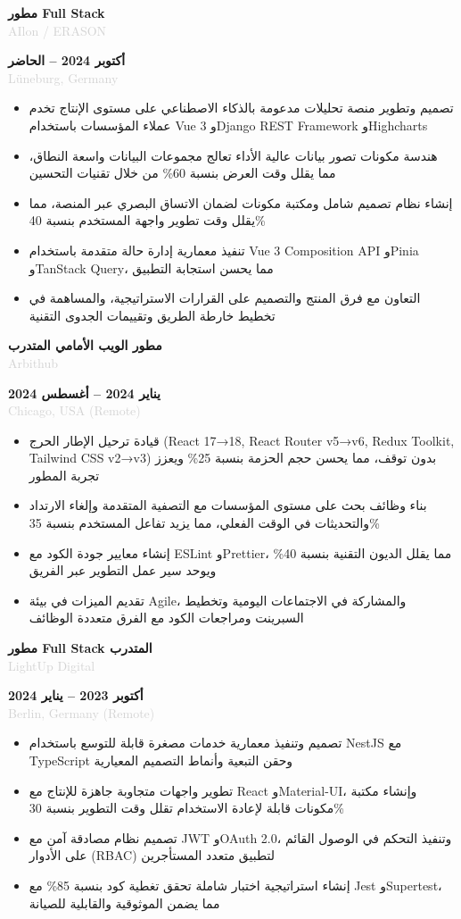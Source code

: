 \documentclass[10pt,a4paper]{article}
\newcommand{\Experience}[4]{%
  \vspace{2pt}
  \noindent
  \begin{minipage}[t]{0.70\textwidth}
    {\normalsize\textbf{\color{darkgray}#3}} \\
    \textcolor{lightgray}{\small #1}
  \end{minipage}%
  \hfill
  \begin{minipage}[t]{0.28\textwidth}
    \raggedleft
    \textcolor{mediumgray}{\small\textbf{#4}} \\
    \textcolor{lightgray}{\small #2}
  \end{minipage}
  \vspace{1pt}
}
\begin{document}
\Experience{AIlon / ERASON}{Lüneburg, Germany}{مطور Full Stack}{أكتوبر 2024 -- الحاضر}
\begin{itemize}
  \item تصميم وتطوير منصة تحليلات مدعومة بالذكاء الاصطناعي على مستوى الإنتاج تخدم عملاء المؤسسات باستخدام Vue 3 وDjango REST Framework وHighcharts
  \item هندسة مكونات تصور بيانات عالية الأداء تعالج مجموعات البيانات واسعة النطاق، مما يقلل وقت العرض بنسبة 60\% من خلال تقنيات التحسين
  \item إنشاء نظام تصميم شامل ومكتبة مكونات لضمان الاتساق البصري عبر المنصة، مما يقلل وقت تطوير واجهة المستخدم بنسبة 40\%
  \item تنفيذ معمارية إدارة حالة متقدمة باستخدام Vue 3 Composition API وPinia وTanStack Query، مما يحسن استجابة التطبيق
  \item التعاون مع فرق المنتج والتصميم على القرارات الاستراتيجية، والمساهمة في تخطيط خارطة الطريق وتقييمات الجدوى التقنية
\end{itemize}

\Experience{Arbithub}{Chicago, USA (Remote)}{مطور الويب الأمامي المتدرب}{يناير 2024 -- أغسطس 2024}
\begin{itemize}
  \item قيادة ترحيل الإطار الحرج (React 17→18, React Router v5→v6, Redux Toolkit, Tailwind CSS v2→v3) بدون توقف، مما يحسن حجم الحزمة بنسبة 25\% ويعزز تجربة المطور
  \item بناء وظائف بحث على مستوى المؤسسات مع التصفية المتقدمة وإلغاء الارتداد والتحديثات في الوقت الفعلي، مما يزيد تفاعل المستخدم بنسبة 35\%
  \item إنشاء معايير جودة الكود مع ESLint وPrettier، مما يقلل الديون التقنية بنسبة 40\% ويوحد سير عمل التطوير عبر الفريق
  \item تقديم الميزات في بيئة Agile، والمشاركة في الاجتماعات اليومية وتخطيط السبرينت ومراجعات الكود مع الفرق متعددة الوظائف
\end{itemize}

\Experience{LightUp Digital}{Berlin, Germany (Remote)}{مطور Full Stack المتدرب}{أكتوبر 2023 -- يناير 2024}
\begin{itemize}
  \item تصميم وتنفيذ معمارية خدمات مصغرة قابلة للتوسع باستخدام NestJS مع TypeScript وحقن التبعية وأنماط التصميم المعيارية
  \item تطوير واجهات متجاوبة جاهزة للإنتاج مع React وMaterial-UI، وإنشاء مكتبة مكونات قابلة لإعادة الاستخدام تقلل وقت التطوير بنسبة 30\%
  \item تصميم نظام مصادقة آمن مع JWT وOAuth 2.0، وتنفيذ التحكم في الوصول القائم على الأدوار (RBAC) لتطبيق متعدد المستأجرين
  \item إنشاء استراتيجية اختبار شاملة تحقق تغطية كود بنسبة 85\% مع Jest وSupertest، مما يضمن الموثوقية والقابلية للصيانة
\end{itemize}
\end{document}
